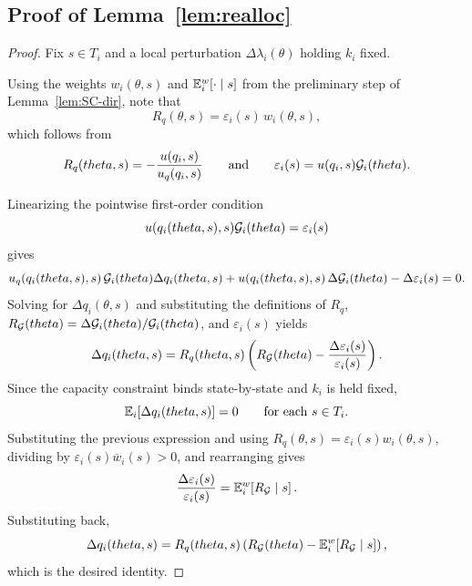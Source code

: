 \documentclass[master.tex]{subfiles}
\begin{document}
\subsection{Proof of Lemma~\ref{lem:realloc}}
\begin{proof}
Fix $s\in T_i$ and a local perturbation $\Delta\lambda_i(\theta)$ holding $k_i$ fixed.

Using the weights $w_i(\theta,s)$ and $\mathbb{E}_i^w[\cdot\mid s]$ from the preliminary step of Lemma~\ref{lem:SC-dir}, note that
\[
R_q(\theta,s)=\varepsilon_i(s)\,w_i(\theta,s),
\]
which follows from
\[
R_q(theta,s)=
-\frac{u(q_i,s)}{u_q(q_i,s)}
\qquad\text{and}\qquad
\varepsilon_i(s)=u(q_i,s)\mathcal{G}_i(theta).
\]

Linearizing the pointwise first-order condition
\[
u(q_i(theta,s),s)\mathcal{G}_i(theta)=\varepsilon_i(s)
\]
gives
\[
u_q\!\left(q_i(theta,s),s\right)\mathcal{G}_i(theta)\Delta q_i(theta,s)
+
u\!\left(q_i(theta,s),s\right)\Delta\mathcal{G}_i(theta)
-
\Delta\varepsilon_i(s)
=
0.
\]
Solving for $\Delta q_i(\theta,s)$ and substituting the definitions of $R_q$, $R_{\mathcal{G}}(theta)=\Delta\mathcal{G}_i(theta)/\mathcal{G}_i(theta)$, and $\varepsilon_i(s)$ yields
\[
\Delta q_i(theta,s)
=
R_q(theta,s)
\left(
R_{\mathcal{G}}(theta)
-
\frac{\Delta\varepsilon_i(s)}{\varepsilon_i(s)}
\right).
\]
Since the capacity constraint binds state-by-state and $k_i$ is held fixed,
\[
\mathbb{E}_i\!\left[\Delta q_i(theta,s)\right]=0
\qquad
\text{for each }s\in T_i.
\]
Substituting the previous expression and using $R_q(\theta,s)=\varepsilon_i(s)w_i(\theta,s)$, dividing by $\varepsilon_i(s)\overline w_i(s)>0$, and rearranging gives
\[
\frac{\Delta\varepsilon_i(s)}{\varepsilon_i(s)}
=
\mathbb{E}_i^w\!\left[R_{\mathcal{G}}\mid s\right].
\]
Substituting back,
\[
\Delta q_i(theta,s)
=
R_q(theta,s)
\left(
R_{\mathcal{G}}(theta)-\mathbb{E}_i^w\!\left[R_{\mathcal{G}}\mid s\right]
\right),
\]
which is the desired identity.
\end{proof}







\end{document}

